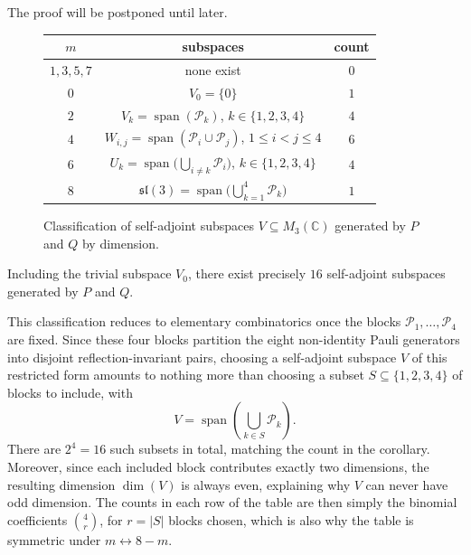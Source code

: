 The proof will be postponed until later.

\begin{figure}[h]
    \begin{center}
        \begin{tabular}{| c | c | c |}
            \hline
            \( m \) & subspaces & count \\
            \hline
            \( 1,3,5,7 \) & none exist & \( 0 \) \\
            \hline
            \( 0 \) & \( V_0 = \{0\} \) & \( 1 \) \\
            \hline
            \( 2 \) & \( V_k = \operatorname{span}(\mathcal{P}_k) \),
            \( k \in \{1,2,3,4\} \) & \( 4 \) \\
            \hline
            \( 4 \) & \( W_{i,j} = \operatorname{span}(\mathcal{P}_i
            \cup \mathcal{P}_j) \), \( 1 \le i < j \le 4 \) & \( 6 \) \\
            \hline
            \( 6 \) & \( U_k = \operatorname{span}\big(\bigcup_{i
            \neq k} \mathcal{P}_i\big) \), \( k \in \{1,2,3,4\} \) & \( 4 \) \\
            \hline
            \( 8 \) & \( \mathfrak{sl}(3) =
                \operatorname{span}\big(\bigcup_{k=1}^4
            \mathcal{P}_k\big) \) & \( 1 \) \\
            \hline
        \end{tabular}
        \caption{Classification of self-adjoint subspaces
            \( V \subseteq M_{3}(\mathbb{C}) \) generated by \( P \)
            and \( Q \) by
        dimension.}
        \label{tab:classification}
    \end{center}
\end{figure}

\begin{corollary}
    \label{cor:sixteen-subspaces}
    Including the trivial subspace \( V_0 \), there exist precisely
    \( 16 \) self-adjoint subspaces generated by \( P \) and \( Q \).
\end{corollary}

This classification reduces to elementary combinatorics once the
blocks \( \mathcal{P}_1, \dots, \mathcal{P}_4 \) are fixed. Since these
four blocks partition the eight non-identity Pauli generators into
disjoint reflection-invariant pairs, choosing a self-adjoint
subspace \( V \) of this restricted form amounts to nothing more than
choosing a subset
\( S \subseteq \{1,2,3,4\} \) of blocks to include, with
\[
    V = \operatorname{span}\left(\bigcup_{k \in S} \mathcal{P}_{k}\right).
\]
There are \( 2^4 = 16 \) such subsets in total, matching the count in
the corollary. Moreover, since each included block contributes exactly
two dimensions, the resulting dimension \( \dim(V) \) is always even,
explaining why \( V \) can never have odd dimension. The counts in
each row of the table are then simply the binomial coefficients
\( \binom{4}{r} \), for \( r = |S| \) blocks chosen, which is also why the
table is symmetric under \( m \leftrightarrow 8-m \).


